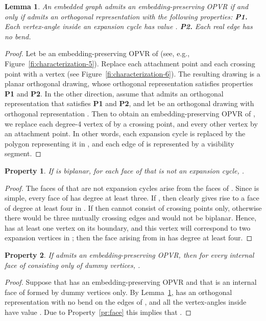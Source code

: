 \documentclass{article}
\newtheorem{lemma}{Lemma}
\newtheorem{property}{Property}
\newcommand{\opvr}{OPVR\xspace}
\begin{document}
\begin{lemma}\label{le:opvr-od}
An embedded graph  admits an embedding-preserving \opvr if and only if  admits an orthogonal representation with the following properties: {\bf P1.} Each vertex-angle inside an expansion cycle has value . {\bf P2.} Each real edge has no bend.
\end{lemma}
\begin{proof}
Let  be an embedding-preserving \opvr of  (see, e.g., Figure~\ref{fi:characterization-5}). Replace each attachment point and each crossing point with a vertex (see Figure~\ref{fi:characterization-6}). The resulting drawing is a planar orthogonal drawing, whose orthogonal representation satisfies properties {\bf P1} and {\bf P2}.
In the other direction, assume that  admits an orthogonal representation  that satisfies {\bf P1} and {\bf P2}, and let  be an orthogonal drawing with orthogonal representation . Then to obtain an embedding-preserving \opvr of , we replace each degree-4 vertex of  by a crossing point, and every other vertex by an attachment point. In other words, each expansion cycle is replaced by the polygon representing it in , and each edge of  is represented by a visibility segment.
\end{proof}

\begin{property}\label{pr:bg-1}
If  is biplanar, for each face  of  that is not an expansion cycle, .
\end{property}
\begin{proof}
The faces of  that are not expansion cycles arise from the faces of .
Since  is simple, every face  of  has degree at least three. If , then  clearly gives rise to a face of degree at least four in . If  then  cannot consist of crossing points only, otherwise there would be three mutually crossing edges and  would not be biplanar. Hence,  has at least one vertex on its boundary, and this vertex will correspond to two expansion vertices in ; then the face arising from  in  has degree at least four.
\end{proof}

\begin{property}\label{pr:bg-2}
If  admits an embedding-preserving \opvr, then for every internal face  of  consisting only of dummy vertices, .
\end{property}
\begin{proof}
Suppose that  has an embedding-preserving \opvr and that  is an internal face of  formed by dummy vertices only. By Lemma~\ref{le:opvr-od},  has an orthogonal representation with no bend on the edges of , and all the vertex-angles inside  have value . Due to Property~\ref{pr:face} this implies that .
\end{proof}
\end{document}
